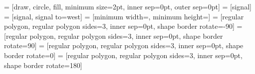     = [draw, circle, fill, minimum size=2pt, inner sep=0pt, outer sep=0pt]
    = [signal]
    = [signal, signal to=west]
  = [minimum width=\blockw, minimum height=\blockh]
  = [regular polygon, regular polygon sides=3, inner sep=0pt, shape border rotate=-90]
   = [regular polygon, regular polygon sides=3, inner sep=0pt, shape border rotate=90]
    = [regular polygon, regular polygon sides=3, inner sep=0pt, shape border rotate=0]
 = [regular polygon, regular polygon sides=3, inner sep=0pt, shape border rotate=180]

